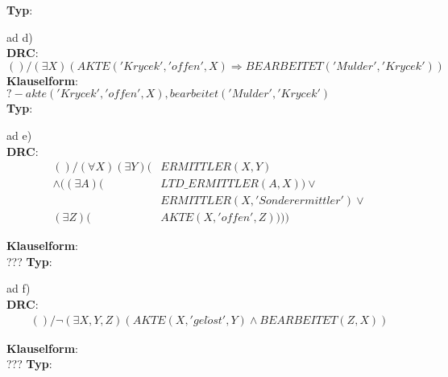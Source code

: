 \documentclass[12pt,a4paper]{amsart}
\begin{document}
\textbf{Typ}:\\

\medskip


ad d) \\

\textbf{DRC}:\\
$() / (\exists X)(AKTE('Krycek', 'offen', X) \Rightarrow BEARBEITET('Mulder', 'Krycek'))$ \\
\textbf{Klauselform}:\\
$? - akte('Krycek', 'offen', X), bearbeitet('Mulder', 'Krycek')$\\
\textbf{Typ}:\\


\medskip


ad e) \\

\textbf{DRC}:\\
\begin{equation}
\begin{split}
() / (\forall X)(\exists Y)(&ERMITTLER(X, Y) \\
\wedge ((\exists A)(&LTD\_ERMITTLER(A, X)) \vee \\
&ERMITTLER(X, 'Sonderermittler') \vee \\
(\exists Z)(&AKTE(X, 'offen', Z))))
\end{split}
\end{equation}

\textbf{Klauselform}:\\
???
\textbf{Typ}:\\

\medskip

ad f) \\

\textbf{DRC}:\\
\begin{equation}
\begin{split}
() / \lnot (\exists X, Y, Z)(AKTE(X, 'gel\ddot{o}st', Y) \wedge BEARBEITET(Z, X))
\end{split}
\end{equation}

\textbf{Klauselform}:\\
???
\textbf{Typ}:\\
\end{document}
